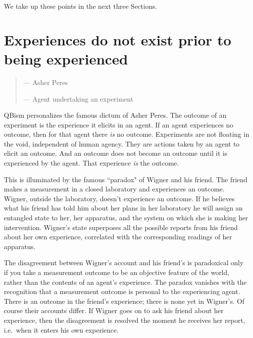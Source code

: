 \documentclass[aps,prb,superscriptaddress,12pt,tightenlines,nofootinbib]{revtex4-2}
\begin{document}
We take up these points in the next three Sections.

\section{Experiences do not exist prior to being experienced}

\begin{quote}

\hskip 10pt --- Asher Peres\cite{Peres78}
\vskip 5pt

\hskip 10pt --- Agent undertaking an experiment
\end{quote}


QBism personalizes the famous dictum of Asher Peres.  The outcome of an experiment is the experience it elicits in an agent.   If an agent experiences no outcome, then for that agent there {\it is\/} no outcome.
Experiments are not  floating in the void, independent of human agency.   They are actions taken by an agent to elicit an outcome.   And an outcome does not become an outcome until it is experienced by the agent.
That experience {\it is} the outcome.

This is illuminated  by the famous ``paradox" of Wigner and his friend.    %
The friend makes a measurement in a closed laboratory and experiences an outcome.  Wigner, outside the laboratory, doesn't experience an outcome. If he believes what his friend has told him about her plans in her laboratory he will assign an entangled state to her, her apparatus, and the system on which she is making her intervention.  Wigner's state superposes all  the possible reports from his friend about her own experience,  correlated with the corresponding readings of her apparatus.

The disagreement between Wigner's account and his friend's is paradoxical only if you take a measurement outcome to be an objective feature of the world, rather than the contents of an agent's experience.   The paradox vanishes with the recognition that a measurement outcome is personal to the experiencing agent.    There is an outcome in the friend's experience; there is none yet in Wigner's. Of course their accounts differ.  If Wigner goes on to ask his friend about her experience, then the disagreement is resolved the moment he receives her report, i.e.~when it enters his own experience.
\end{document}
